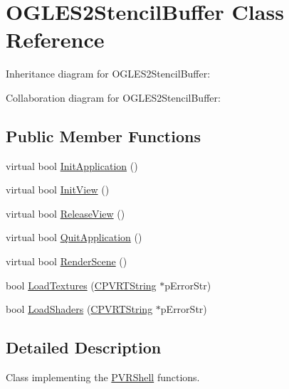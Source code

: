 \hypertarget{class_o_g_l_e_s2_stencil_buffer}{\section{O\+G\+L\+E\+S2\+Stencil\+Buffer Class Reference}
\label{class_o_g_l_e_s2_stencil_buffer}
}


Inheritance diagram for O\+G\+L\+E\+S2\+Stencil\+Buffer\+:


Collaboration diagram for O\+G\+L\+E\+S2\+Stencil\+Buffer\+:
\subsection*{Public Member Functions}
\begin{DoxyCompactItemize}
\item 
virtual bool \hyperlink{class_o_g_l_e_s2_stencil_buffer_abdf5b3778dddb217d6e5719057c467ab}{Init\+Application} ()
\item 
virtual bool \hyperlink{class_o_g_l_e_s2_stencil_buffer_a8cadbc1bc5640324d75090e8b50fc5d9}{Init\+View} ()
\item 
virtual bool \hyperlink{class_o_g_l_e_s2_stencil_buffer_a6c1ffd6921af57bb68ba2ef5a238bdd5}{Release\+View} ()
\item 
virtual bool \hyperlink{class_o_g_l_e_s2_stencil_buffer_ae19bd670359e1eb74048529fcc8b3ed5}{Quit\+Application} ()
\item 
virtual bool \hyperlink{class_o_g_l_e_s2_stencil_buffer_acc86da305a2f068e2ea803dcdc39197e}{Render\+Scene} ()
\item 
bool \hyperlink{class_o_g_l_e_s2_stencil_buffer_a701e764a4e9f939fa1ee1d8777872fe4}{Load\+Textures} (\hyperlink{class_c_p_v_r_t_string}{C\+P\+V\+R\+T\+String} $\ast$p\+Error\+Str)
\item 
bool \hyperlink{class_o_g_l_e_s2_stencil_buffer_a487a479951d55163faee1065b2216825}{Load\+Shaders} (\hyperlink{class_c_p_v_r_t_string}{C\+P\+V\+R\+T\+String} $\ast$p\+Error\+Str)
\end{DoxyCompactItemize}


\subsection{Detailed Description}


 Class implementing the \hyperlink{class_p_v_r_shell}{P\+V\+R\+Shell} functions. 

